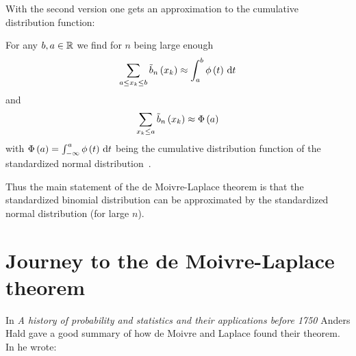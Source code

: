 \noindent With the second version one gets an approximation to the cumulative distribution function:

\begin{theorem}
  For any $b,a \in \mathbb R$ we find for $n$ being large enough~\cite[p. 136]{georgii}\cite[p. 67]{irle}
  \begin{align}
    \sum_{a \le x_{k}\le b} \tilde b_{n}\left({x_{k}}\right) \approx \int_a^b \phi\left( {t} \right) \,\mathrm d{t}
  \end{align}
  and
  \begin{align}
    \sum_{x_{k} \le a} \tilde b_{n}\left({x_{k}}\right) \approx \Phi\left( {a} \right)
  \end{align}
  with $\Phi\left( {a} \right) = \int_{-\infty}^a \phi\left( {t} \right) \,\mathrm d{t}$ being the cumulative distribution function of the standardized normal distribution~\cite[p. 134]{georgii}.
\end{theorem}

Thus the main statement of the de Moivre-Laplace theorem is that the standardized binomial distribution can be approximated by the standardized normal distribution (for large $n$).



\section{Journey to the de Moivre-Laplace theorem}

In \emph{A history of probability and statistics and their applications before 1750} Anders Hald gave a good summary of how de Moivre and Laplace found their theorem. In \cite[pp. 469-470]{hald1} he wrote:

